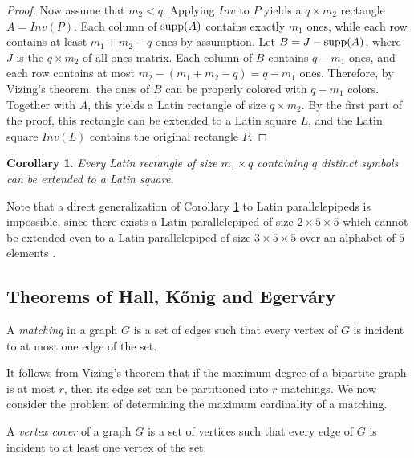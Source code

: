\documentclass[11pt]{article}
\newtheorem{corollary}{Corollary}[section]
\theoremstyle{definition}
\newcommand{\supp}{{\rm supp}}
\begin{document}
{{{\begin{proof}
Now assume that $m_2<q$. Applying $Inv$ to $P$ yields a $q\times m_2$ rectangle $A=Inv(P)$. Each column of $\supp(A)$ contains exactly $m_1$ ones, while each row contains at least $m_1+m_2-q$ ones by assumption.
 Let $B=J-\supp(A)$, where $J$
is the $q\times m_2$  of all-ones matrix. Each
column of $B$ contains $q-m_1$ ones, and  each row contains at most  $m_2-(m_1+m_2-q)=q-m_1$ ones.
 Therefore, by Vizing's theorem, the ones of $B$ can be properly colored with $q-m_1$ colors.
 Together with $A$, this yields a Latin rectangle of size $q\times m_2$. By the first part of the proof, this rectangle can be extended to a Latin square $L$, and the Latin square $Inv(L)$ contains the original rectangle $P$.
 \end{proof}

\begin{corollary}\label{cor:latangle}
Every Latin rectangle of size $m_1\times q$ containing $q$
distinct symbols can be extended to a Latin square.
\end{corollary}


Note that a direct generalization of Corollary \ref{cor:latangle} to
Latin parallelepipeds is impossible, since there exists a Latin
parallelepiped of size $2\times 5\times 5$ which cannot be
extended even to a Latin parallelepiped of size $3\times
5\times 5$ over an alphabet of $5$ elements \cite{MKW}.




\subsection{Theorems of Hall, Kőnig and Egerváry}



A {\sl matching} in a graph $G$ is a set of edges such that every
vertex of $G$ is incident to at most one edge of the set.

It follows from Vizing's theorem that if the maximum degree of a
bipartite graph is at most $r$, then its edge set can be partitioned
into $r$ matchings.
We now consider the problem of determining the maximum cardinality of
a matching.

A {\sl vertex cover} of a graph $G$ is a set of vertices such that
every edge of $G$ is incident to at least one vertex of the set.

}}}
\end{document}
